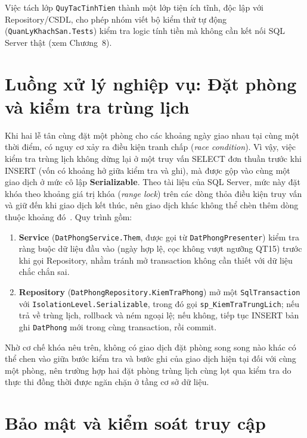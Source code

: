 \documentclass[14pt]{report}
\begin{document}
Việc tách lớp \texttt{QuyTacTinhTien} thành một lớp tiện ích tĩnh, độc lập với Repository/CSDL, cho phép nhóm viết bộ kiểm thử tự động (\texttt{QuanLyKhachSan.Tests}) kiểm tra logic tính tiền mà không cần kết nối SQL Server thật (xem Chương~8).

\section{Luồng xử lý nghiệp vụ: Đặt phòng và kiểm tra trùng lịch}

Khi hai lễ tân cùng đặt một phòng cho các khoảng ngày giao nhau tại cùng một thời điểm, có nguy cơ xảy ra điều kiện tranh chấp (\emph{race condition}). Vì vậy, việc kiểm tra trùng lịch không dừng lại ở một truy vấn SELECT đơn thuần trước khi INSERT (vốn có khoảng hở giữa kiểm tra và ghi), mà được gộp vào cùng một giao dịch ở mức cô lập \textbf{Serializable}. Theo tài liệu của SQL Server, mức này đặt khóa theo khoảng giá trị khóa (\emph{range lock}) trên các dòng thỏa điều kiện truy vấn và giữ đến khi giao dịch kết thúc, nên giao dịch khác không thể chèn thêm dòng thuộc khoảng đó~\cite{ms-isolation}. Quy trình gồm:

\begin{enumerate}
  \item \textbf{Service} (\texttt{DatPhongService.Them}, được gọi từ \texttt{DatPhongPresenter}) kiểm tra ràng buộc dữ liệu đầu vào (ngày hợp lệ, cọc không vượt ngưỡng QT15) trước khi gọi Repository, nhằm tránh mở transaction không cần thiết với dữ liệu chắc chắn sai.
  \item \textbf{Repository} (\texttt{DatPhongRepository.KiemTraPhong}) mở một \texttt{SqlTransaction} với \texttt{IsolationLevel.Serializable}, trong đó gọi \texttt{sp\_KiemTraTrungLich}; nếu trả về trùng lịch, rollback và ném ngoại lệ; nếu không, tiếp tục INSERT bản ghi \texttt{DatPhong} mới trong cùng transaction, rồi commit.
\end{enumerate}

Nhờ cơ chế khóa nêu trên, không có giao dịch đặt phòng song song nào khác có thể chen vào giữa bước kiểm tra và bước ghi của giao dịch hiện tại đối với cùng một phòng, nên trường hợp hai đặt phòng trùng lịch cùng lọt qua kiểm tra do thực thi đồng thời được ngăn chặn ở tầng cơ sở dữ liệu.

\section{Bảo mật và kiểm soát truy cập}
\end{document}
